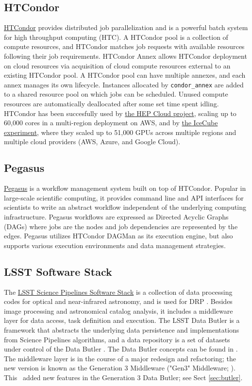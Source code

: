 \subsection{HTCondor}
\href{https://research.cs.wisc.edu/htcondor}{HTCondor} \citep{Thain:2005:Condor} provides distributed job parallelization and is a powerful batch system for high throughput computing (HTC).
A HTCondor pool is a collection of compute resources, and HTCondor matches job requests with available resources following their job requirements.
HTCondor Annex allows HTCondor deployment on cloud resources via acquisition of cloud compute resources external to an existing HTCondor pool.
A HTCondor pool can have multiple annexes, and each annex manages its own lifecycle.
Instances allocated by \texttt{condor\_annex} are added to a shared resource pool on which jobs can be scheduled.
Unused compute resources are automatically deallocated after some set time spent idling.
HTCondor has been succesfully used by \href{https://aws.amazon.com/blogs/aws/experiment-that-discovered-the-higgs-boson-uses-aws-to-probe-nature}{the HEP Cloud project}, scaling up to 60,000 cores in a multi-region deployment on AWS, and by \href{https://www.linkedin.com/pulse/using-50k-gpus-across-multiple-clouds-icecube-science-igor-sfiligoi}{the IceCube experiment}, where they scaled up to 51,000 GPUs across multiple regions and multiple cloud providers (AWS, Azure, and Google Cloud).
\subsection{Pegasus}
\href{https://pegasus.isi.edu/}{Pegasus} \citep{Deelman:2015:Pegasus} is a workflow management system built on top of HTCondor.
Popular in large-scale scientific computing, it provides command line and API interfaces for scientists to write an abstract workflow independent of the underlying computing infrastructure.
Pegasus workflows are expressed as Directed Acyclic Graphs (DAGs) where jobs are the nodes and job dependencies are represented by the edges.
Pegasus utilizes HTCondor DAGMan as its execution engine, but also supports various execution environments and data management strategies.
\subsection{LSST Software Stack}
The \href{https://pipelines.lsst.io/}{LSST Science Pipelines Software Stack} is a collection of data processing codes for optical and near-infrared astronomy, and is used for DRP \citep{2019ASPC..523..521B}.
Besides image processing and astronomical catalog analysis, it includes a middleware layer for data access, task definition and execution.
The LSST Data Butler is a framework that abstracts the underlying data persistence and implementations from Science Pipelines algorithms, and a data repository is a set of datasets under control of the Data Butler \citep{2018arXiv181208085J}.
The Data Butler concepts can be found in .
The middleware layer is in the course of a major redesign and refactoring; the new version is known as the Generation 3 Middleware ("Gen3" Middleware; ).
This \poc~added new features in the Generation 3 Data Butler; see Sect \ref{sec:butler}.


